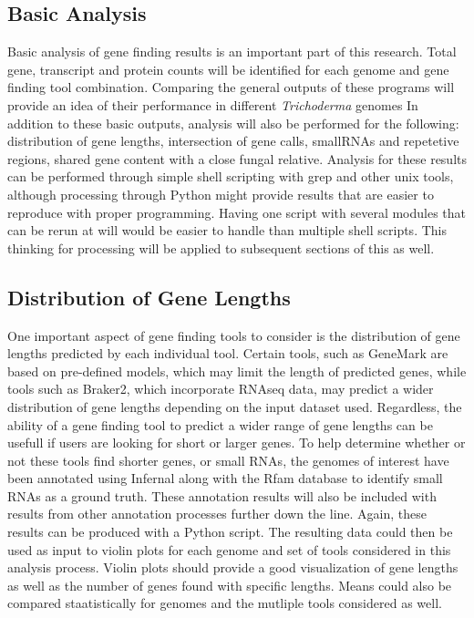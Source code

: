\documentclass[12pt]{article}
\begin{document}
\subsection{Basic Analysis}

Basic analysis of gene finding results is an important part of this
research. Total gene, transcript and protein counts will be identified
for each genome and gene finding tool combination. Comparing the
general outputs of these programs will provide an idea of their
performance in different \textit{Trichoderma} genomes In addition to
these basic outputs, analysis will also be performed for the
following: distribution of gene lengths, intersection of gene calls,
smallRNAs and repetetive regions, shared gene content with a close
fungal relative. Analysis for these results can be performed through
simple shell scripting with grep and other unix tools, although
processing through Python might provide results that are easier to
reproduce with proper programming. Having one script with several
modules that can be rerun at will would be easier to handle than
multiple shell scripts. This thinking for processing will be applied
to subsequent sections of this as well.

\subsection{Distribution of Gene Lengths}

One important aspect of gene finding tools to consider is the
distribution of gene lengths predicted by each individual
tool. Certain tools, such as GeneMark are based on pre-defined models,
which may limit the length of predicted genes, while tools such as
Braker2, which incorporate RNAseq data, may predict a wider
distribution of gene lengths depending on the input dataset
used. Regardless, the ability of a gene finding tool to predict a
wider range of gene lengths can be usefull if users are looking for
short or larger genes. To help determine whether or not these tools
find shorter genes, or small RNAs, the genomes of interest have been
annotated using Infernal along with the Rfam database to identify
small RNAs as a ground truth. These annotation results will also be
included with results from other annotation processes further down the
line. Again, these results can be produced with a Python script. The
resulting data could then be used as input to violin plots for each
genome and set of tools considered in this analysis process. Violin
plots should provide a good visualization of gene lengths as well as
the number of genes found with specific lengths. Means could also be
compared staatistically for genomes and the mutliple tools considered
as well.
\end{document}
